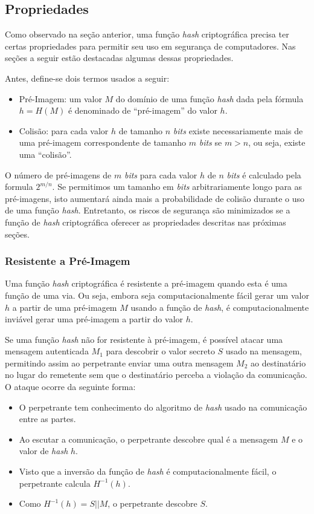 \subsection{Propriedades}

Como observado na seção anterior, uma função \textit{hash} criptográfica
precisa ter certas propriedades para permitir seu uso em segurança de
computadores. Nas seções a seguir estão destacadas algumas dessas propriedades.

Antes, define-se dois termos usados a seguir:
\begin{itemize}
    \item Pré-Imagem: um valor $M$ do domínio de uma função \textit{hash} dada
        pela fórmula $h = H(M)$ é denominado de “pré-imagem” do valor $h$.
    \item Colisão: para cada valor $h$ de tamanho $n$ \textit{bits} existe
        necessariamente mais de uma pré-imagem correspondente de tamanho $m$
        \textit{bits} se $m > n$, ou seja, existe uma ``colisão''.
\end{itemize}

O número de pré-imagens de $m$ \textit{bits} para cada valor $h$ de $n$
\textit{bits} é calculado pela formula $2^{m/n}$. Se permitimos um tamanho em
\textit{bits} arbitrariamente longo para as pré-imagens, isto aumentará ainda
mais a probabilidade de colisão durante o uso de uma função \textit{hash}.
Entretanto, os riscos de segurança são minimizados se a função de \textit{hash}
criptográfica oferecer as propriedades descritas nas próximas seções.

\subsubsection{Resistente a Pré-Imagem}

Uma função \textit{hash} criptográfica é resistente a pré-imagem quando esta é
uma função de uma via. Ou seja, embora seja computacionalmente fácil gerar um
valor $h$ a partir de uma pré-imagem $M$ usando a função de \textit{hash}, é
computacionalmente inviável gerar uma pré-imagem a partir do valor $h$.

Se uma função \textit{hash} não for resistente à pré-imagem, é possível atacar
uma mensagem autenticada $M_1$ para descobrir o valor secreto $S$ usado na
mensagem, permitindo assim ao perpetrante enviar uma outra mensagem $M_2$ ao
destinatário no lugar do remetente sem que o destinatário perceba a violação da
comunicação. O ataque ocorre da seguinte forma:
\begin{itemize}
    \item O perpetrante tem conhecimento do algoritmo de \textit{hash} usado na
        comunicação entre as partes.
    \item Ao escutar a comunicação, o perpetrante descobre qual é a mensagem
        $M$ e o valor de \textit{hash} $h$.
    \item Visto que a inversão da função de \textit{hash} é computacionalmente
        fácil, o perpetrante calcula $H^{-1}(h)$.
    \item Como $H^{-1}(h) = S || M$, o perpetrante descobre $S$.
\end{itemize}

